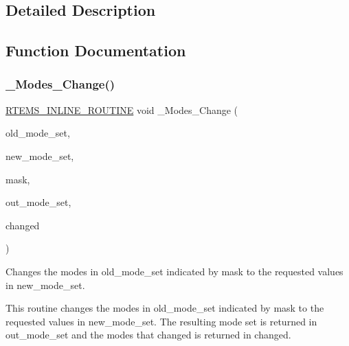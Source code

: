 \subsection{Detailed Description}


\subsection{Function Documentation}
\mbox{\label{group__ClassicModesImpl_gae1c92cd554eae72a503e0209dfe6c620}} 
\subsubsection{\texorpdfstring{\_Modes\_Change()}{\_Modes\_Change()}}
{\footnotesize\ttfamily \mbox{\hyperlink{group__RTEMSScoreBaseDefs_gac216239df231d5dbd15e3520b0b9313f}{R\+T\+E\+M\+S\+\_\+\+I\+N\+L\+I\+N\+E\+\_\+\+R\+O\+U\+T\+I\+NE}} void \+\_\+\+Modes\+\_\+\+Change (\begin{DoxyParamCaption}\item[{\mbox{\hyperlink{group__ClassicModes_ga8d46a41a837840dc97336fdcd20e4f68}{rtems\+\_\+mode}}}]{old\+\_\+mode\+\_\+set,  }\item[{\mbox{\hyperlink{group__ClassicModes_ga8d46a41a837840dc97336fdcd20e4f68}{rtems\+\_\+mode}}}]{new\+\_\+mode\+\_\+set,  }\item[{\mbox{\hyperlink{group__ClassicModes_ga8d46a41a837840dc97336fdcd20e4f68}{rtems\+\_\+mode}}}]{mask,  }\item[{\mbox{\hyperlink{group__ClassicModes_ga8d46a41a837840dc97336fdcd20e4f68}{rtems\+\_\+mode}} $\ast$}]{out\+\_\+mode\+\_\+set,  }\item[{\mbox{\hyperlink{group__ClassicModes_ga8d46a41a837840dc97336fdcd20e4f68}{rtems\+\_\+mode}} $\ast$}]{changed }\end{DoxyParamCaption})}



Changes the modes in old\+\_\+mode\+\_\+set indicated by mask to the requested values in new\+\_\+mode\+\_\+set. 

This routine changes the modes in old\+\_\+mode\+\_\+set indicated by mask to the requested values in new\+\_\+mode\+\_\+set. The resulting mode set is returned in out\+\_\+mode\+\_\+set and the modes that changed is returned in changed. \mbox{\label{group__ClassicModesImpl_ga3badf3f95421e122383aa0a5ffed70b7}} 
